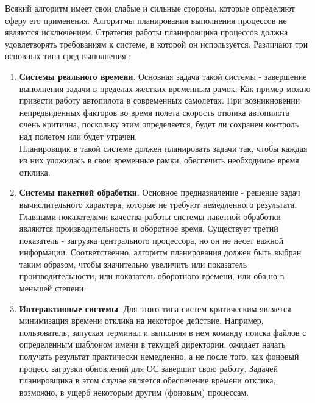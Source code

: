 Всякий алгоритм имеет свои слабые и сильные стороны, которые определяют сферу его применения. Алгоритмы планирования выполнения процессов не являются исключением. Стратегия работы планировщика процессов должна 
удовлетворять требованиям к системе, в которой он используется. Различают три основных типа сред выполнения \cite{tanenbaum}:
\begin{enumerate}[label=---]
\item \textbf{Системы реального времени}. Основная задача такой системы - завершение выполнения задачи в пределах жестких временным рамок. Как пример можно привести работу автопилота в современных самолетах. При возникновении непредвиденных факторов во время полета скорость отклика автопилота очень критична, поскольку этим определяется, будет ли сохранен контроль над полетом или будет утрачен.\\ Планировщик в такой системе должен планировать задачи так, чтобы каждая из них уложилась в свои временные рамки, обеспечить необходимое время отклика.
\item \textbf{Системы пакетной обработки}. Основное предназначение - решение задач вычислительного характера, которые не требуют немедленного результата. Главными показателями качества работы системы пакетной обработки являются производительность и оборотное время. Существует третий показатель - загрузка центрального процессора, но он не несет важной информации. Соответственно, алгоритм планирования должен быть выбран таким образом, чтобы значительно увеличить или показатель производительности, или показатель оборотного времени, или оба,но в меньшей степени.
\item \textbf{Интерактивные системы}. Для этого типа систем критическим является минимизация времени отклика на некоторое действие. Например, пользователь, запуская терминал и выполняя в нем команду поиска файлов с определенным шаблоном имени в текущей директории, ожидает начать получать результат практически немедленно, а не после того, как фоновый процесс загрузки обновлений для ОС завершит свою работу. Задачей планировщика в этом случае является обеспечение времени отклика, возможно, в ущерб некоторым другим (фоновым) процессам.
\end{enumerate}
